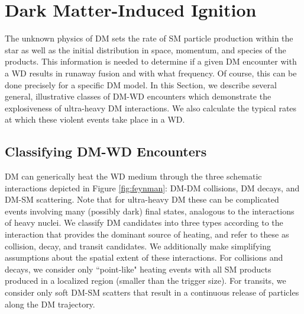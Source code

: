 \documentclass[twocolumn, preprintnumbers,amsmath,amssymb,prd, superscriptaddress]{revtex4}
\newcommand{\GeV}{\text{GeV}}
\newcommand{\cm}{\text{cm}}
\begin{document}


\section{Dark Matter-Induced Ignition}
\label{sec:DMexplode}

The unknown physics of DM sets the rate of SM particle production within the star as well as the initial distribution in space, momentum, and species of the products.
This information is needed to determine if a given DM encounter with a WD results in runaway fusion and with what frequency. 
Of course, this can be done precisely for a specific DM model. 
In this Section, we describe several general, illustrative classes of DM-WD encounters which demonstrate the explosiveness of ultra-heavy DM interactions.
We also calculate the typical rates at which these violent events take place in a WD. 

\subsection{Classifying DM-WD Encounters}

DM can generically heat the WD medium through the three schematic interactions depicted in Figure \ref{fig:feynman}: DM-DM collisions, DM decays, and DM-SM scattering.
Note that for ultra-heavy DM these can be complicated events involving many (possibly dark) final states, analogous to the interactions of heavy nuclei.
We classify DM candidates into three types according to the interaction that provides the dominant source of heating, and refer to these as collision, decay, and transit candidates.
We additionally make simplifying assumptions about the spatial extent of these interactions.
For collisions and decays, we consider only ``point-like" heating events with all SM products produced in a localized region (smaller than the trigger size).
For transits, we consider only soft DM-SM scatters that result in a continuous release of particles along the DM trajectory.
\end{document}
